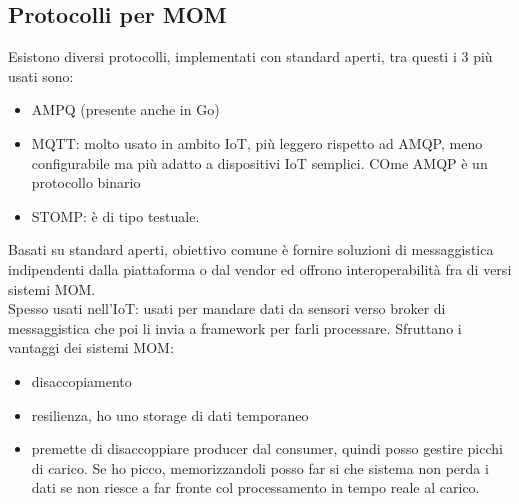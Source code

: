 \documentclass{article}
\begin{document}
\subsection{Protocolli per MOM}
Esistono diversi protocolli, implementati con standard aperti, tra questi i 3 più usati sono:
\begin{itemize}
\item AMPQ (presente anche in Go)
\item MQTT: molto usato in ambito IoT, più leggero rispetto ad AMQP, meno configurabile ma più adatto a dispositivi IoT semplici. COme AMQP è un protocollo binario
\item STOMP: è di tipo testuale.
\end{itemize}
Basati su standard aperti, obiettivo comune è fornire soluzioni di messaggistica indipendenti dalla piattaforma o dal vendor ed offrono interoperabilità fra di versi sistemi MOM.\\ Spesso usati nell'IoT: usati per mandare dati da sensori verso broker di messaggistica che poi li invia a framework per farli processare. Sfruttano i vantaggi dei sistemi MOM:
\begin{itemize}
\item disaccopiamento
\item resilienza, ho uno storage di dati temporaneo
\item premette di disaccoppiare producer dal consumer, quindi posso gestire picchi di carico. Se ho picco, memorizzandoli posso far si che sistema non perda i dati se non riesce a far fronte col processamento in tempo reale al carico.
\end{itemize}
\end{document}
